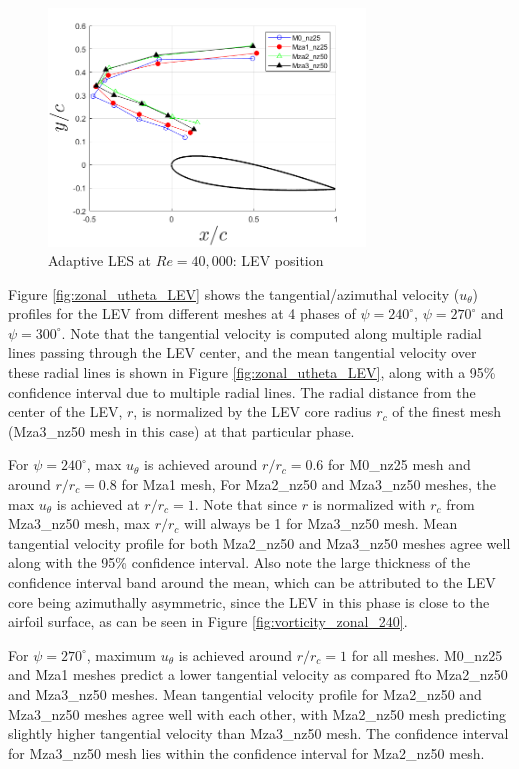 \begin{figure}[H]
	\centering
	\includegraphics[width=0.75\textwidth]{figures/zonal_adapt_results/LEV/LEV_location}
	\caption{ Adaptive LES at $Re=40,000$: LEV position}
	\label{fig:zonal_LEV_location}
\end{figure}

Figure \ref{fig:zonal_utheta_LEV} shows the tangential/azimuthal velocity ($u_{\theta}$) profiles for the LEV from different meshes at 4 phases of $\psi = 240^\circ$,  $\psi = 270^\circ$ and  $\psi = 300^\circ$. 
Note that the tangential velocity is computed along multiple radial lines passing through the LEV center, and the mean tangential velocity over these radial lines is shown in Figure \ref{fig:zonal_utheta_LEV}, along with a 95\% confidence interval due to multiple radial lines.
The radial distance from the center of the LEV, $r$, is normalized by the LEV core radius $r_c$ of the finest mesh (Mza3\_nz50 mesh in this case) at that particular phase. 

For $\psi = 240^\circ$, max $u_\theta$ is achieved around $r/r_c = 0.6$ for M0\_nz25 mesh and around $r/r_c = 0.8$ for Mza1 mesh, 
For Mza2\_nz50 and Mza3\_nz50 meshes, the max $u_\theta$ is achieved at $r/r_c = 1$. Note that since $r$ is normalized with $r_c$ from Mza3\_nz50 mesh, max $r/r_c$ will always be 1 for Mza3\_nz50 mesh. 
Mean tangential velocity profile for both Mza2\_nz50 and Mza3\_nz50 meshes agree well along with the 95\% confidence interval. 
Also note the large thickness of the confidence interval band around the mean, which can be attributed to the LEV core being azimuthally asymmetric, since the LEV in this phase is close to the airfoil surface, as can be seen in Figure \ref{fig:vorticity_zonal_240}.

For $\psi = 270^\circ$, maximum $u_\theta$ is achieved around $r/r_c= 1$ for all meshes. 
M0\_nz25 and Mza1 meshes predict a lower tangential velocity as compared fto Mza2\_nz50 and Mza3\_nz50 meshes. 
Mean tangential velocity profile for Mza2\_nz50 and Mza3\_nz50 meshes agree well with each other, with Mza2\_nz50 mesh predicting slightly higher tangential velocity than Mza3\_nz50 mesh. 
The confidence interval for Mza3\_nz50 mesh lies within the confidence interval for Mza2\_nz50 mesh.

